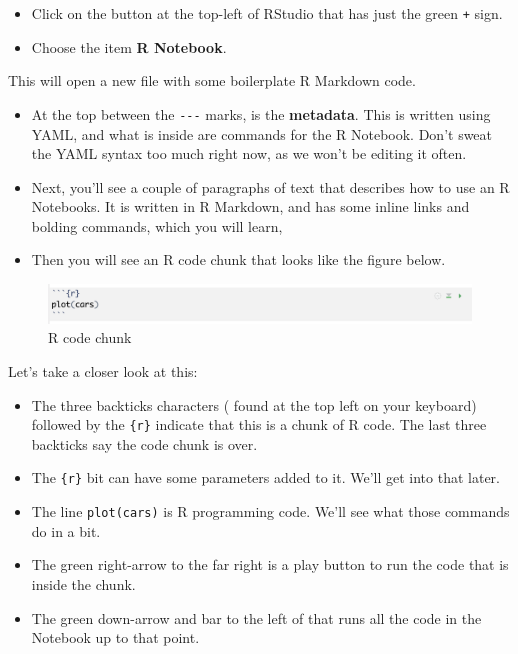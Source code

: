 \documentclass[]{book}
\providecommand{\tightlist}{%
  \setlength{\itemsep}{0pt}\setlength{\parskip}{0pt}}
\begin{document}
\begin{itemize}
\tightlist
\item
  Click on the button at the top-left of RStudio that has just the green
  \texttt{+} sign.
\item
  Choose the item \textbf{R Notebook}.
\end{itemize}

This will open a new file with some boilerplate R Markdown code.

\begin{itemize}
\tightlist
\item
  At the top between the \texttt{-\/-\/-} marks, is the
  \textbf{metadata}. This is written using YAML, and what is inside are
  commands for the R Notebook. Don't sweat the YAML syntax too much
  right now, as we won't be editing it often.
\item
  Next, you'll see a couple of paragraphs of text that describes how to
  use an R Notebooks. It is written in R Markdown, and has some inline
  links and bolding commands, which you will learn,
\item
  Then you will see an R code chunk that looks like the figure below.
\end{itemize}

\begin{figure}
\centering
\includegraphics[width=6.25000in]{images/02-rstudio-rcodechunk.png}
\caption{R code chunk}
\end{figure}

Let's take a closer look at this:

\begin{itemize}
\tightlist
\item
  The three backticks characters ( found at the top left on your
  keyboard) followed by the \texttt{\{r\}} indicate that this is a chunk
  of R code. The last three backticks say the code chunk is over.
\item
  The \texttt{\{r\}} bit can have some parameters added to it. We'll get
  into that later.
\item
  The line \texttt{plot(cars)} is R programming code. We'll see what
  those commands do in a bit.
\item
  The green right-arrow to the far right is a play button to run the
  code that is inside the chunk.
\item
  The green down-arrow and bar to the left of that runs all the code in
  the Notebook up to that point.
\end{itemize}
\end{document}
